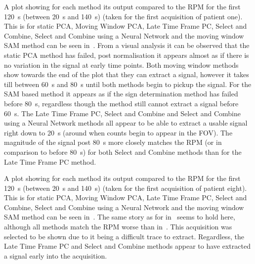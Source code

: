     A plot showing for each method its output compared to the \gls{RPM} for the first \SI{120}{\second} (between \SI{20}{\second} and \SI{140}{\second}) (taken for the first acquisition of patient one). This is for static \gls{PCA}, Moving Window \gls{PCA}, Late Time Frame \gls{PC}, Select and Combine, Select and Combine using a Neural Network and the moving window \gls{SAM} method can be seen in~. From a visual analysis it can be observed that the static \gls{PCA} method has failed, post normalisation it appears almost as if there is no variation in the signal at early time points. Both moving window methods show towards the end of the plot that they can extract a signal, however it takes till between \SI{60}{\second} and \SI{80}{\second} until both methods begin to pickup the signal. For the \gls{SAM} based method it appears as if the sign determination method has failed before \SI{80}{\second}, regardless though the method still cannot extract a signal before \SI{60}{\second}. The Late Time Frame \gls{PC}, Select and Combine and Select and Combine using a Neural Network methods all appear to be able to extract a usable signal right down to \SI{20}{\second} (around when counts begin to appear in the \gls{FOV}). The magnitude of the signal post \SI{80}{\second} more closely matches the \gls{RPM} (or in comparison to before \SI{80}{\second}) for both Select and Combine methods than for the Late Time Frame \gls{PC} method.
    
    A plot showing for each method its output compared to the \gls{RPM} for the first \SI{120}{\second} (between \SI{20}{\second} and \SI{140}{\second}) (taken for the first acquisition of patient eight). This is for static \gls{PCA}, Moving Window \gls{PCA}, Late Time Frame \gls{PC}, Select and Combine, Select and Combine using a Neural Network and the moving window \gls{SAM} method can be seen in~. The same story as for in~ seems to hold here, although all methods match the \gls{RPM} worse than in~. This acquisition was selected to be shown due to it being a difficult trace to extract. Regardless, the Late Time Frame \gls{PC} and Select and Combine methods appear to have extracted a signal early into the acquisition.
    

